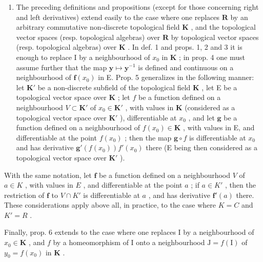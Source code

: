 \begin{enumerate}
\def\labelenumi{\arabic{enumi})}
\setcounter{enumi}{1}
\tightlist
\item
  The preceding definitions and propositions (except for those concerning right and left derivatives) extend easily to the case where one replaces \(\mathbf{R}\) by an arbitrary commutative non-discrete topological field \(\mathbf{K}\) , and the topological vector spaces (resp. topological algebras) over \(\mathbf{R}\) by topological vector spaces (resp. topological algebras) over \(\mathbf{K}\) . In def. 1 and props. 1, 2 and 3 it is enough to replace I by a neighbourhood of \(x_0\) in \(\mathbf{K}\) ; in prop. 4 one must assume further that the map \(\mathbf{y} \mapsto \mathbf{y}^{-1}\) is defined and continuous on a neighbourhood of \(\mathbf{f}(x_0)\) in E. Prop. 5 generalizes in the following manner: let \(\mathbf{K}'\) be a non-discrete subfield of the topological field \(\mathbf{K}\) , let E be a topological vector space over \(\mathbf{K}\) ; let \(f\) be a function defined on a neighbourhood \(V \subset \mathbf{K}'\) of \(x_0 \in \mathbf{K}'\) , with values in \(\mathbf{K}\) (considered as a topological vector space over \(\mathbf{K}'\) ), differentiable at \(x_0\) , and let \(\mathbf{g}\) be a function defined on a neighbourhood of \(f(x_0) \in \mathbf{K}\) , with values in E, and differentiable at the point \(f(x_0)\) ; then the map \(\mathbf{g} \circ f\) is differentiable at \(x_0\) and has derivative \(\mathbf{g}'(f(x_0))f'(x_0)\) there (E being then considered as a topological vector space over \(\mathbf{K}'\) ).
\end{enumerate}

With the same notation, let \(\mathbf{f}\) be a function defined on a neighbourhood \(V\) of \(a \in K\) , with values in \(E\) , and differentiable at the point \(a\) ; if \(a \in K'\) , then the restriction of \(\mathbf{f}\) to \(V \cap K'\) is differentiable at \(a\) , and has derivative \(\mathbf{f}'(a)\) there. These considerations apply above all, in practice, to the case where \(K = C\) and \(K' = R\) .

Finally, prop. 6 extends to the case where one replaces I by a neighbourhood of \(x_0 \in \mathbf{K}\) , and \(f\) by a homeomorphism of I onto a neighbourhood \(\mathrm{J} = f(\mathrm{I})\) of \(y_0 = f(x_0)\) in \(\mathbf{K}\) .

